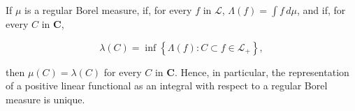 If $\mu$ is a regular Borel measure, if, for every $f$ in $\mathcal{L}$, $\Lambda(f) = \int f \, d\mu$, and if, for every $C$ in $\mathbf{C}$,

$$\lambda(C) = \inf \left\{ \Lambda(f) : C \subset f \in \mathcal{L}_+ \right\},$$

then $\mu(C) = \lambda(C)$ for every $C$ in $\mathbf{C}$. Hence, in particular, the representation of a positive linear functional as an integral with respect to a regular Borel measure is unique.
